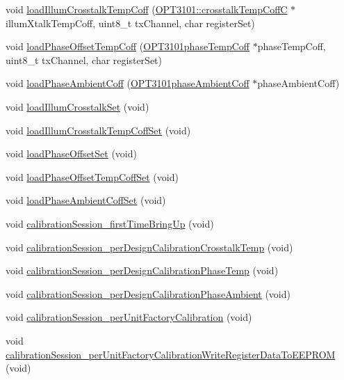 \begin{DoxyCompactItemize}
\item 
void \mbox{\hyperlink{class_o_p_t3101device_ad5782b69e7af9d5cf4db1bd2ba9caf67}{load\+Illum\+Crosstalk\+Temp\+Coff}} (\mbox{\hyperlink{class_o_p_t3101_1_1crosstalk_temp_coff_c}{O\+P\+T3101\+::crosstalk\+Temp\+CoffC}} $\ast$illum\+Xtalk\+Temp\+Coff, uint8\+\_\+t tx\+Channel, char register\+Set)
\item 
void \mbox{\hyperlink{class_o_p_t3101device_a72d8a44690cd8d65852522612478b067}{load\+Phase\+Offset\+Temp\+Coff}} (\mbox{\hyperlink{class_o_p_t3101phase_temp_coff}{O\+P\+T3101phase\+Temp\+Coff}} $\ast$phase\+Temp\+Coff, uint8\+\_\+t tx\+Channel, char register\+Set)
\item 
void \mbox{\hyperlink{class_o_p_t3101device_a58c9087de66fea64ac3ab69fc6a37288}{load\+Phase\+Ambient\+Coff}} (\mbox{\hyperlink{class_o_p_t3101phase_ambient_coff}{O\+P\+T3101phase\+Ambient\+Coff}} $\ast$phase\+Ambient\+Coff)
\item 
void \mbox{\hyperlink{class_o_p_t3101device_af18fa1d1db587c0e220d0bbc955662a9}{load\+Illum\+Crosstalk\+Set}} (void)
\item 
void \mbox{\hyperlink{class_o_p_t3101device_a00d7d06d232d29570cbc6f751b991419}{load\+Illum\+Crosstalk\+Temp\+Coff\+Set}} (void)
\item 
void \mbox{\hyperlink{class_o_p_t3101device_accaae5aebd551e2198567c1131887700}{load\+Phase\+Offset\+Set}} (void)
\item 
void \mbox{\hyperlink{class_o_p_t3101device_a01faedadfb6abb470781ae01fe6b744e}{load\+Phase\+Offset\+Temp\+Coff\+Set}} (void)
\item 
void \mbox{\hyperlink{class_o_p_t3101device_aa4cf1fb930424717a4e7fb969b68bde6}{load\+Phase\+Ambient\+Coff\+Set}} (void)
\item 
void \mbox{\hyperlink{class_o_p_t3101device_af2dc559857f5d8d209b9f10c3f1cd758}{calibration\+Session\+\_\+first\+Time\+Bring\+Up}} (void)
\item 
void \mbox{\hyperlink{class_o_p_t3101device_a545184fdfeca4a576d613ef190131c05}{calibration\+Session\+\_\+per\+Design\+Calibration\+Crosstalk\+Temp}} (void)
\item 
void \mbox{\hyperlink{class_o_p_t3101device_a7b7bc05a1555200f13abda6f08218ad7}{calibration\+Session\+\_\+per\+Design\+Calibration\+Phase\+Temp}} (void)
\item 
void \mbox{\hyperlink{class_o_p_t3101device_aee76419eb68c21ce03cb92818d485a6a}{calibration\+Session\+\_\+per\+Design\+Calibration\+Phase\+Ambient}} (void)
\item 
void \mbox{\hyperlink{class_o_p_t3101device_a873af9bc068728c4ded36435065b448c}{calibration\+Session\+\_\+per\+Unit\+Factory\+Calibration}} (void)
\item 
void \mbox{\hyperlink{class_o_p_t3101device_a6d9e6e45e260f4af1a874b5075105792}{calibration\+Session\+\_\+per\+Unit\+Factory\+Calibration\+Write\+Register\+Data\+To\+E\+E\+P\+R\+OM}} (void)
\end{DoxyCompactItemize}
